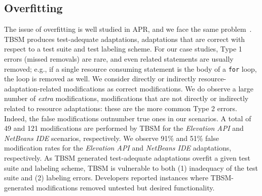 \subsection{Overfitting}
The issue of overfitting is well studied in APR, and we face the same problem~\cite{smith2015cwd}. TBSM produces test-adequate adaptations, adaptations that are correct with respect to a test suite and test labeling scheme. For our case studies, Type 1 errors (missed removals) are rare, and even related statements are usually removed; e.g., if a single resource consuming statement is the body of a {\tt for} loop, the loop is removed as well. We consider directly or indirectly resource-adaptation-related modifications as correct modifications. We do observe a large number of \emph{extra} modifications, modifications that are not directly or indirectly related to resource adaptations: these are the more common Type 2 errors. Indeed, the false modifications outnumber true ones in our scenarios. A total of 49 and 121 modifications are performed by TBSM for the \textit{Elevation API} and \textit{NetBeans IDE} scenarios, respectively. We observe 91\% and 51\% false modification rates for the \textit{Elevation API} and \textit{NetBeans IDE} adaptations, respectively. As TBSM generated test-adequate adaptations overfit a given test suite and labeling scheme, TBSM is vulnerable to both (1) inadequacy of the test suite and (2) labeling errors. Developers reported instances where TBSM-generated modifications removed untested but desired functionality. 
